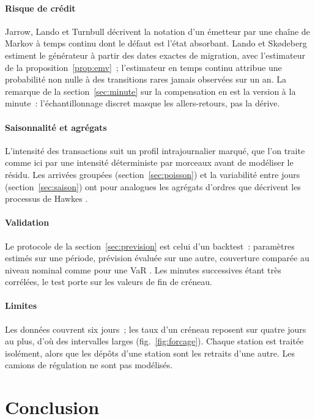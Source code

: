 \paragraph{Risque de crédit} Jarrow, Lando et Turnbull \cite{JLT97} décrivent la notation d'un émetteur par une chaîne de Markov à temps continu dont le défaut est l'état absorbant. Lando et Skødeberg \cite{LS02} estiment le générateur à partir des dates exactes de migration, avec l'estimateur de la proposition~\ref{prop:emv}~; l'estimateur en temps continu attribue une probabilité non nulle à des transitions rares jamais observées sur un an. La remarque de la section~\ref{sec:minute} sur la compensation en est la version à la minute~: l'échantillonnage discret masque les allers-retours, pas la dérive.

\paragraph{Saisonnalité et agrégats} L'intensité des transactions suit un profil intrajournalier marqué, que l'on traite comme ici par une intensité déterministe par morceaux avant de modéliser le résidu. Les arrivées groupées (section~\ref{sec:poisson}) et la variabilité entre jours (section~\ref{sec:saison}) ont pour analogues les agrégats d'ordres que décrivent les processus de Hawkes \cite{BMM15}.

\paragraph{Validation} Le protocole de la section~\ref{sec:prevision} est celui d'un backtest~: paramètres estimés sur une période, prévision évaluée sur une autre, couverture comparée au niveau nominal comme pour une VaR \cite{Kup95}. Les minutes successives étant très corrélées, le test porte sur les valeurs de fin de créneau.

\paragraph{Limites} Les données couvrent six jours~; les taux d'un créneau reposent sur quatre jours au plus, d'où des intervalles larges (fig.~\ref{fig:forcage}). Chaque station est traitée isolément, alors que les dépôts d'une station sont les retraits d'une autre. Les camions de régulation ne sont pas modélisés.

\section{Conclusion}

